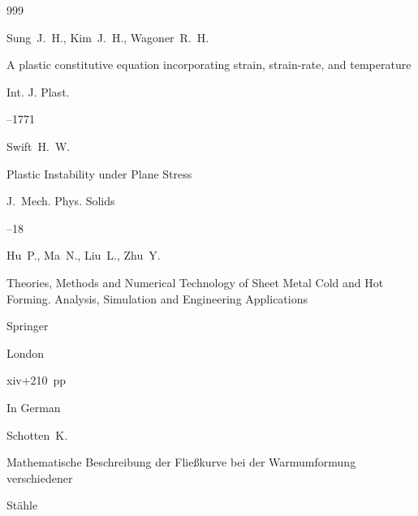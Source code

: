 \begin{thebibliography}{999}




\by Sung~J.~H., Kim~J.~H., Wagoner~R.~H.

\paper A plastic constitutive equation incorporating strain, strain-rate, and temperature


\jour Int. J. Plast. 



--1771 







\by  Swift~H.~W.

\paper Plastic Instability under Plane Stress

\jour J.~Mech. Phys. Solids




--18





\by Hu~P., Ma~N., Liu~L., Zhu~Y. 

\book Theories, Methods and Numerical Technology of Sheet Metal Cold and Hot Forming. Analysis, Simulation and Engineering Applications


\publ Springer

\publaddr London

\totalpages xiv+210~pp \nofrills









\lang In German

\by Schotten~K.

\thesis Mathematische     Beschreibung     der     Flie{\ss}kurve   bei   der   Warmumformung   verschiedener   

St\"ahle


\end{thebibliography}
